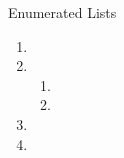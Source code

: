 \documentclass[\string~/GitHub/sthlmNordBeamerTheme/sthlmNordLightDemo.tex]{subfiles}
\begin{document}
\begin{frame}[fragile]{Enumerated Lists}
	\begin{enumerate}
		\item \lipsum[1][1]
		\item \lipsum[1][2]
		      \begin{enumerate}
			      \item \lipsum[2][1]
			      \item \lipsum[2][2]
		      \end{enumerate}
		\item \lipsum[1][3]
		\item \lipsum[1][4]
	\end{enumerate}

\end{frame}
\end{document}
